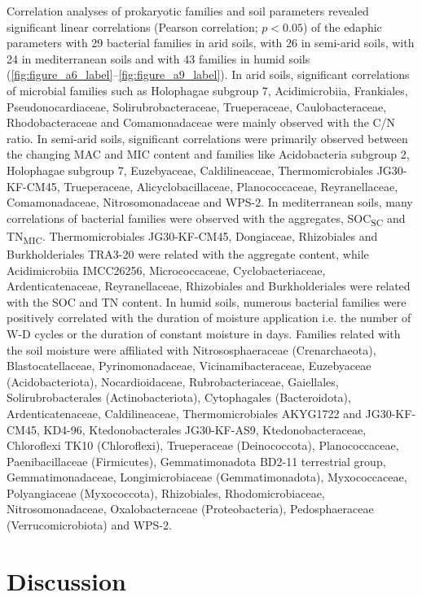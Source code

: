 Correlation analyses of prokaryotic families and soil parameters revealed significant linear correlations (Pearson correlation; \(p < 0.05\)) of the edaphic parameters with 29 bacterial families in arid soils, with 26 in semi-arid soils, with 24 in mediterranean soils and with 43 families in humid soils (\cref{fig:figure_a6_label}--\cref{fig:figure_a9_label}). 
In arid soils, significant correlations of microbial families such as Holophagae subgroup 7, Acidimicrobiia, Frankiales, Pseudonocardiaceae, Solirubrobacteraceae, Trueperaceae, Caulobacteraceae, Rhodobacteraceae and Comamonadaceae were mainly observed with the C/N ratio. 
In semi-arid soils, significant correlations were primarily observed between the changing MAC and MIC content and families like Acidobacteria subgroup 2, Holophagae subgroup 7, Euzebyaceae, Caldilineaceae, Thermomicrobiales JG30-KF-CM45, Trueperaceae, Alicyclobacillaceae, Planococcaceae, Reyranellaceae, Comamonadaceae, Nitrosomonadaceae and WPS-2. 
In mediterranean soils, many correlations of bacterial families were observed with the aggregates, SOC\textsubscript{SC} and TN\textsubscript{MIC}. 
Thermomicrobiales JG30-KF-CM45, Dongiaceae, Rhizobiales and Burkholderiales TRA3-20 were related with the aggregate content, while Acidimicrobiia IMCC26256, Micrococcaceae, Cyclobacteriaceae, Ardenticatenaceae, Reyranellaceae, Rhizobiales and Burkholderiales were related with the SOC and TN content. 
In humid soils, numerous bacterial families were positively correlated with the duration of moisture application i.e. the number of W-D cycles or the duration of constant moisture in days. 
Families related with the soil moisture were affiliated with Nitrososphaeraceae (Crenarchaeota), Blastocatellaceae, Pyrinomonadaceae, Vicinamibacteraceae, Euzebyaceae (Acidobacteriota), Nocardioidaceae, Rubrobacteriaceae, Gaiellales, Solirubrobacterales (Actinobacteriota), Cytophagales (Bacteroidota), Ardenticatenaceae, Caldilineaceae, Thermomicrobiales AKYG1722 and JG30-KF-CM45, KD4-96, Ktedonobacterales JG30-KF-AS9, Ktedonobacteraceae, Chloroflexi TK10 (Chloroflexi), Trueperaceae (Deinococcota), Planococcaceae, Paenibacillaceae (Firmicutes), Gemmatimonadota BD2-11 terrestrial group, Gemmatimonadaceae, Longimicrobiaceae (Gemmatimonadota), Myxococcaceae, Polyangiaceae (Myxococcota), Rhizobiales, Rhodomicrobiaceae, Nitrosomonadaceae, Oxalobacteraceae (Proteobacteria), Pedosphaeraceae (Verrucomicrobiota) and WPS-2.

\section{Discussion}

